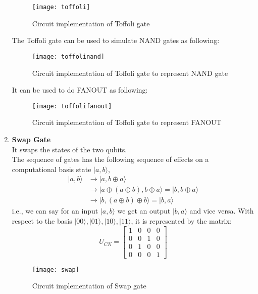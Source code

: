 \documentclass[12pt]{report}
\begin{document}
\begin{enumerate}
\begin{table}[h!]
\end{table}
\begin{figure}[h]
\centering
\texttt{[image: toffoli]}
\caption{Circuit implementation of Toffoli gate}
\label{fig:toffoli}
\end{figure}
\newpage
The Toffoli gate can be used to simulate NAND gates as following: 
\begin{figure}[h]
\centering
\texttt{[image: toffolinand]}
\caption{Circuit implementation of Toffoli gate to represent NAND gate}
\label{fig:toffolinand}
\end{figure} \newline
It can be used to do FANOUT as following:
\begin{figure}[h]
\centering
\texttt{[image: toffolifanout]}
\caption{Circuit implementation of Toffoli gate to represent FANOUT}
\label{fig:toffolifanout}
\end{figure}
\item \textbf{Swap Gate}\\
It swaps the states of the two qubits.\\
The sequence of gates has the following sequence of effects on a computational basis state $|a,b\rangle$,
\begin{equation}
\begin{split}
|a,b\rangle &\to |a,b \oplus a\rangle \\
& \to |a\oplus(a\oplus b),b\oplus a\rangle =| b,b\oplus a\rangle \\
&\to|b, (a\oplus b) \oplus b\rangle = |b,a\rangle
\end{split}
\end{equation}
i.e., we can say for an input $|a,b\rangle$ we get an output $|b,a\rangle$ and vice versa. 
With respect to the basis $|00\rangle, |01\rangle, |10\rangle, |11\rangle$, it is represented by the matrix:
\begin{equation*}
U_{CN} = 
\begin{bmatrix} 
1& 0 & 0& 0\\ 
0& 0 & 1& 0\\
0& 1 & 0& 0\\
0& 0 & 0& 1
\end{bmatrix}
\end{equation*}
\begin{figure}[h]
\centering
\texttt{[image: swap]}
\caption{Circuit implementation of Swap gate}
\label{fig:swap}
\end{figure}
\newpage

\end{enumerate}
\end{document}

